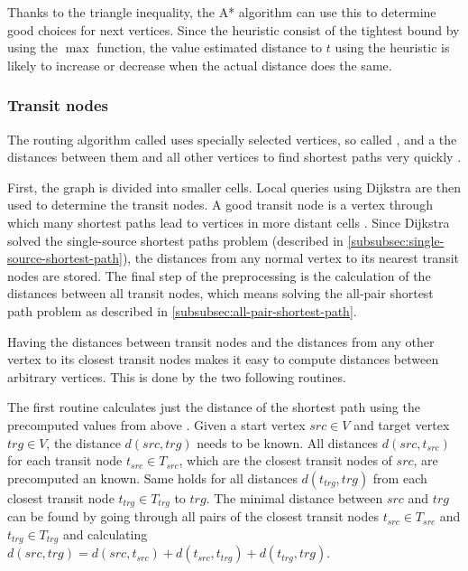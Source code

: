 			Thanks to the triangle inequality, the A* algorithm can use this to determine good choices for next vertices.
			Since the heuristic consist of the tightest bound by using the $\max$ function, the value estimated distance to $t$ using the heuristic is likely to increase or decrease when the actual distance does the same.
		
		\subsubsection{Transit nodes}
		\label{subsubsec:transit}
		
			The routing algorithm called  uses specially selected vertices, so called , and a the distances between them and all other vertices to find shortest paths very quickly \cite{bast-transit}.
		
			First, the graph is divided into smaller cells.
			Local queries using Dijkstra are then used to determine the transit nodes.
			A good transit node is a vertex through which many shortest paths lead to vertices in more distant cells \cite[6]{bast-transit}. 
			Since Dijkstra solved the single-source shortest paths problem (described in \cref{subsubsec:single-source-shortest-path}), the distances from any normal vertex to its nearest transit nodes are stored.
			The final step of the preprocessing is the calculation of the distances between all transit nodes, which means solving the all-pair shortest path problem as described in \cref{subsubsec:all-pair-shortest-path}.
			
			Having the distances between transit nodes and the distances from any other vertex to its closest transit nodes makes it easy to compute distances between arbitrary vertices.
			This is done by the two following routines.
			
			The first routine calculates just the distance of the shortest path using the precomputed values from above \cite[7-8]{bast-transit}.
			Given a start vertex $src \in V$ and target vertex $trg \in V$, the distance $d(src, trg)$ needs to be known.
			All distances $d(src, t_{src})$ for each transit node $t_{src} \in T_{src}$, which are the closest transit nodes of $src$, are precomputed an known.
			Same holds for all distances $d(t_{trg}, trg)$ from each closest transit node $t_{trg} \in T_{trg}$ to $trg$.
			The minimal distance between $src$ and $trg$ can be found by going through all pairs of the closest transit nodes $t_{src} \in T_{src}$ and $t_{trg} \in T_{trg}$ and calculating $d(src, trg) = d(src, t_{src}) + d(t_{src}, t_{trg}) + d(t_{trg}, trg)$.
			
